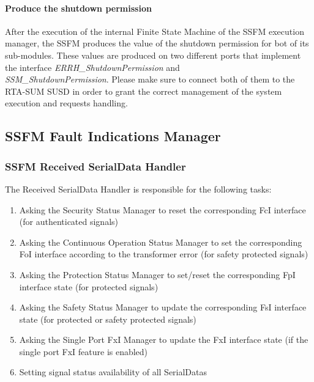 \paragraph{Produce the shutdown permission}
After the execution of the internal Finite State Machine of the SSFM execution manager, the SSFM produces the value of the shutdown permission for bot of its sub-modules.
These values are produced on two different ports that implement the interface \textit{ERRH\_ShutdownPermission} and\\\textit{SSM\_ShutdownPermission}. Please make sure to connect both of them
to the RTA-SUM SUSD in order to grant the correct management of the system execution and requests handling.

\subsection{SSFM Fault Indications Manager}
\label{sec:FaultIndicationsManager}

\subsubsection{SSFM Received SerialData Handler}
\label{subsec:receivedsignalgroupman}

The Received SerialData Handler is responsible for the following tasks:

\begin{enumerate}
\item Asking the Security Status Manager to reset the corresponding FcI interface (for authenticated signals)
\item Asking the Continuous Operation Status Manager to set the corresponding FoI interface according to the transformer error (for safety protected signals)
\item Asking the Protection Status Manager to set/reset the corresponding FpI interface state (for protected signals)
\item Asking the Safety Status Manager to update the corresponding FsI interface state (for protected or safety protected signals)
\item Asking the Single Port FxI Manager to update the FxI interface state (if the single port FxI feature is enabled)
\item Setting signal status availability of all SerialDatas
\end{enumerate}

